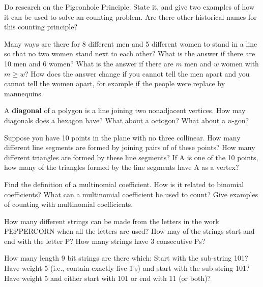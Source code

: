 \begin{exercise}
Do research on the Pigeonhole Principle.  State it, and give two examples of how it can be used to solve an counting problem.  Are there other historical names for this counting principle?
\end{exercise}

\begin{exercise} 
Many ways are there for 8 different men and 5 different women to stand in a line so that no two women stand next to each other? What is the answer if there are 10 men and 6 women?  What is the answer if there are $m$ men and $w$ women with $m\geq w$?  How does the answer change if you cannot tell the men apart and you cannot tell the women apart, for example if the people were replace by mannequins.
\end{exercise}

\begin{exercise} 
A {\bf diagonal} of a polygon is a line joining two nonadjacent vertices.  How may diagonals does a hexagon have? What about a octogon? What about a $n$-gon?
\end{exercise}

\begin{exercise}
Suppose you have 10 points in the plane with no three collinear.  How many different line segments are formed by joining pairs of  of these points? How many different triangles are formed by these line segments?  If A is one of the 10 points, how many of the triangles formed by the line segments have A as a vertex?
\end{exercise}

\begin{exercise}
Find the definition of a multinomial coefficient.  How is it related to binomial coefficients?  What can a multinomial coefficient be used to count?  Give examples of counting with multinomial coefficients.
\end{exercise}

\begin{exercise}
How many different strings can be made from the letters in the work PEPPERCORN when all the letters are used?  How may of the strings start and end with the letter P?  How many strings have 3 consecutive Ps?
\end{exercise}

\begin{exercise}
How many length 9 bit strings are there which:
Start with the sub-string 101? \\
Have weight 5 (i.e., contain exactly five 1’s) and start with the sub-string 101? \\
Have weight 5 and either start with 101 or end with 11 (or both)? \\
\end{exercise}

